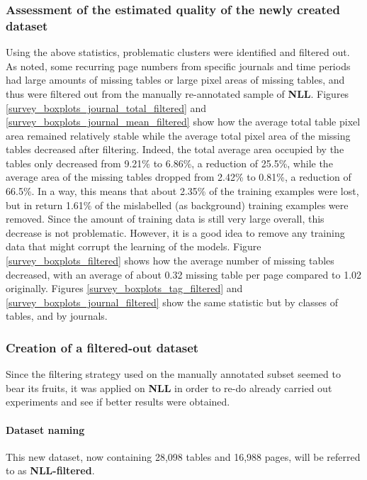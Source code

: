 \subsubsection{Assessment of the estimated quality of the newly created dataset}
Using the above statistics, problematic clusters were identified and filtered out. As noted, some recurring page numbers from specific journals and time periods had large amounts of missing tables or large pixel areas of missing tables, and thus were filtered out from the manually re-annotated sample of \textbf{NLL}. Figures \ref{survey_boxplots_journal_total_filtered} and \ref{survey_boxplots_journal_mean_filtered} show how the average total table pixel area remained relatively stable while the average total pixel area of the missing tables decreased after filtering. Indeed, the total average area occupied by the tables only decreased from 9.21\% to 6.86\%, a reduction of 25.5\%, while the average area of the missing tables dropped from 2.42\% to 0.81\%, a reduction of 66.5\%. In a way, this means that about 2.35\% of the training examples were lost, but in return 1.61\% of the mislabelled (as background) training examples were removed. Since the amount of training data is still very large overall, this decrease is not problematic. However, it is a good idea to remove any training data that might corrupt the learning of the models. Figure \ref{survey_boxplots_filtered} shows how the average number of missing tables decreased, with an average of about 0.32 missing table per page compared to 1.02 originally. Figures \ref{survey_boxplots_tag_filtered} and \ref{survey_boxplots_journal_filtered} show the same statistic but by classes of tables, and by journals.

\subsubsection{Creation of a filtered-out dataset}
Since the filtering strategy used on the manually annotated subset seemed to bear its fruits, it was applied on \textbf{NLL} in order to re-do already carried out experiments and see if better results were obtained. 

\paragraph{Dataset naming}
This new dataset, now containing 28,098 tables and 16,988 pages, will be referred to as \textbf{NLL-filtered}.

